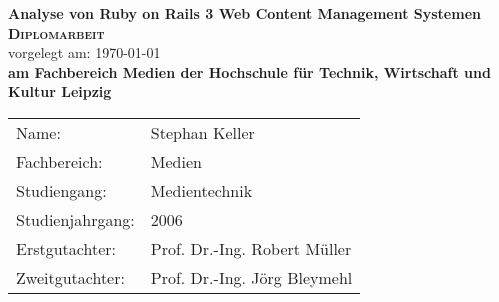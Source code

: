 \begin{titlepage}
    \begin{center}
    \huge \textbf{\textsf{Analyse von Ruby on Rails 3 Web Content Management Systemen}} \\
    \vspace{2cm}
    \LARGE\textbf{\textsc{Diplomarbeit}}\\
    \vspace{1cm}
    \normalsize
    vorgelegt am: \today \\
    \vspace{2.5cm}
    \large \textbf{am Fachbereich Medien der Hochschule für Technik, Wirtschaft und Kultur Leipzig}\\
    \vspace{3cm}
    \end{center}
 \normalsize{
    \begin{tabular}{ll}
    	Name: & {Stephan Keller} \\
    	Fachbereich: & Medien\\
      	Studiengang: & Medientechnik\\
    	Studienjahrgang: & 2006\\
      Erstgutachter: & {Prof. Dr.-Ing. Robert Müller} \\
      Zweitgutachter: & {Prof. Dr.-Ing. Jörg Bleymehl} \\
    \end{tabular}\\
    }
\end{titlepage}





